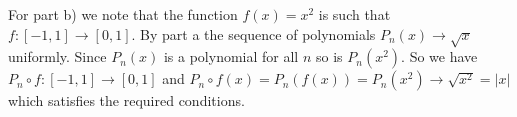 \documentclass[11pt,reqno]{article}
\begin{document}
\noindent For part b) we note that the function $f(x) = x^2$ is such that $f : [-1,1] \to [0,1]$. By part a the sequence of polynomials $P_n(x) \to \sqrt{x}$ uniformly. Since $P_n(x)$ is a polynomial for all $n$ so is $P_n(x^2)$. So we have $P_n \circ f : [-1,1] \to [0,1]$ and $P_n \circ f(x) = P_n(f(x)) = P_n(x^2) \to \sqrt{x^2} = |x|$ which satisfies the required conditions.
\end{document}
